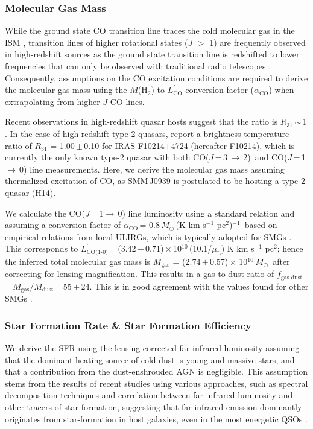 \documentclass[iop, revtex4]{emulateapj}
\newcommand{\Msun}{\mbox{$M_{\odot}$}}
\newcommand{\rarr}{$\rightarrow$}
\newcommand{\CO}{\mbox{CO($J$\,=\,3\,$\rightarrow$\,2) }}
\newcommand{\Lp}{\mbox{$L^{\prime}_\textrm{CO(1-0)}$}}
\newcommand{\LpU}{\mbox{K\,\,km\,\,s$^{-1}$\,\,pc$^2$}}
\newcommand{\eg}{{\sl e.g.,~}}
\newcommand{\pmOne}{\mbox{$^{-1}$}}
\begin{document}
\subsubsection{Molecular Gas Mass} \label{sec:gas}
While the ground state CO transition line traces the cold molecular gas in the ISM
\citep*[\eg][]{Wilson70a,Downes98a}, transition lines of higher rotational states ($J$ $>$ 1) are frequently observed in high-redshift sources as the
 ground state transition line is redshifted to lower frequencies that can only be observed with traditional radio telescopes
 \citep{Carilli13a}. Consequently, assumptions on the CO excitation conditions are required to derive the molecular gas mass using the $M$(H$_\textrm{2}$)-to-$L^{\prime}_\textrm{CO}$
 conversion factor ($\alpha_\mathrm{CO}$) when extrapolating from higher-$J$ CO lines. \par
Recent observations in high-redshift quasar hosts suggest that the ratio
   is $R_\textrm{31}$\,$\sim$\,1 \citep{Riechers06a, Riechers11a}. In the case of high-redshift type-2 quasars, \citet{Riechers11a} report a brightness temperature ratio of $R_\textrm{31}$ = 1.00\,$\pm$\,0.10 for IRAS F10214+4724 (hereafter F10214), which is currently the only known type-2 quasar with both \CO and CO($J$\,=\,1\,\rarr\,0) line measurements.
Here, we derive the molecular gas mass
assuming thermalized excitation of CO, as SMM\,J0939 is
postulated to be hosting a type-2 quasar (H14). \par
We calculate the CO($J$\,=\,1\rarr\,0) line luminosity using a standard relation
\citep[\eg][]{Solomon05a}
and assuming a conversion factor of $\alpha_\textrm{CO}$\,= 0.8\,\Msun\,(\LpU)\pmOne\ based on empirical relations from local ULIRGs, which is typically
adopted for SMGs \citep[\eg][]{Tacconi06a,Tacconi08a,Bothwell13a}.
This corresponds to \Lp = (3.42\,$\pm$\,0.71)\,$\times$\,10$^{10}$\,(10.1/$\mu_\textrm{L}$) \LpU; hence the inferred total molecular gas mass is $M_\textrm{gas}$ = (2.74\,$\pm$\,0.57)\,$\times$\,\,10$^{10}$\,\Msun\, after correcting for lensing magnification. This results in a gas-to-dust
ratio of $f_\textrm{gas-dust}$\,=\,$M_\textrm{gas}/M_\textrm{dust}$\,=\,55\,$\pm$\,24.
This is in good agreement  with the
values found for other SMGs \citep{Coppin08a,Micha10a,Riechers11c}.

\subsubsection{Star Formation Rate \& Star Formation Efficiency}
We derive the SFR using the lensing-corrected far-infrared luminosity
assuming
that the dominant heating source of cold-dust is young and massive stars, and
that a contribution from the
dust-enshrouded AGN is negligible.
This assumption stems from the results of recent studies using various approaches, such as spectral decomposition techniques and correlation between far-infrared luminosity and other tracers of star-formation, suggesting that far-infrared emission dominantly originates from star-formation in host galaxies, even in the most energetic QSOs \citep[\eg][]{Netzer07a, Mullaney11a, Harrison15a}.
\end{document}
